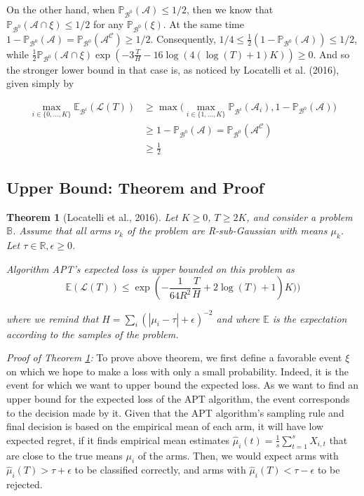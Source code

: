 \documentclass[12pt,]{article}
\newtheorem{theorem}{Theorem}
\begin{document}
On the other hand, when
\(\mathbb{P}_{\mathcal{B}^0}(\mathcal{A}) \leq 1/2\), then we know that
\(\mathbb{P}_{\mathcal{B}^0}(\mathcal{A} \cap \xi) \leq 1/2\) for any
\(\mathbb{P}_{\mathcal{B}^0}(\xi)\). At the same time
\(1-\mathbb{P}_{\mathcal{B}^0}(\mathcal{A}) = \mathbb{P}_{\mathcal{B}^0}(\mathcal{A^C}) \geq 1/2\).
Consequently,
\(1/4 \leq \frac{1}{2}(1 - \mathbb{P}_{\mathcal{B}^0}(\mathcal{A})) \leq 1/2\),
while
\(\frac{1}{2}\mathbb{P}_{\mathcal{B}^0} (\mathcal{A} \cap \xi) \exp (- 3 \frac{T}{H} -16 \log(4(\log(T)+1)K)) \geq 0\).
And so the stronger lower bound in that case is, as noticed by Locatelli
et al. (2016), given simply by

\begin{align*}
\max_{i \in \{0, \dots, K\}} \mathbb{E}_{\mathcal{B}^i} (\mathcal{L}(T)) & \geq \max \big( \max_{i \in \{1, \dots, K\}} \mathbb{P}_{\mathcal{B}^i}(\mathcal{A}_i), 1 - \mathbb{P}_{\mathcal{B}^0}(\mathcal{A}) \big) \\
& \geq 1 - \mathbb{P}_{\mathcal{B}^0}(\mathcal{A}) = \mathbb{P}_{\mathcal{B}^0}(\mathcal{A^C}) \\
& \geq \frac{1}{2}
\end{align*}

\subsection{Upper Bound: Theorem and
Proof}\label{upper-bound-theorem-and-proof}

\begin{theorem}[Locatelli et al., 2016] \label{theorem:LocatelliTheorem4}
Let $K \geq 0$, $T \geq 2K$, and consider a problem $\mathbb{B}$. Assume that
all arms $\nu_k$ of the problem are R-sub-Gaussian with means $\mu_k$. Let $\tau
\in \mathbb{R}, \epsilon \geq 0$.

Algorithm APT's expected loss is upper bounded on this problem as 
\begin{equation*} \mathbb{E}(\mathcal{L}(T)) \leq \exp
(-\frac{1}{64R^2}\frac{T}{H} + 2 \log (T) + 1)K)) \end{equation*}

where we remind that $H = \sum_i (|\mu_i - \tau | + \epsilon)^{-2}$ and where
$\mathbb{E}$ is the expectation according to the samples of the problem.
\end{theorem}

\emph{Proof of Theorem \ref{theorem:LocatelliTheorem4}:} To prove above
theorem, we first define a favorable event \(\xi\) on which we hope to
make a loss with only a small probability. Indeed, it is the event for
which we want to upper bound the expected loss. As we want to find an
upper bound for the expected loss of the APT algorithm, the event
corresponds to the decision made by it. Given that the APT algorithm's
sampling rule and final decision is based on the empirical mean of each
arm, it will have low expected regret, if it finds empirical mean
estimates \(\hat{\mu}_i(t) = \frac{1}{s} \sum_{t=1}^s X_{i,t}\) that are
close to the true means \(\mu_i\) of the arms. Then, we would expect
arms with \(\hat{\mu}_i(T) > \tau + \epsilon\) to be classified
correctly, and arms with \(\hat{\mu}_i(T) < \tau - \epsilon\) to be
rejected.
\end{document}

